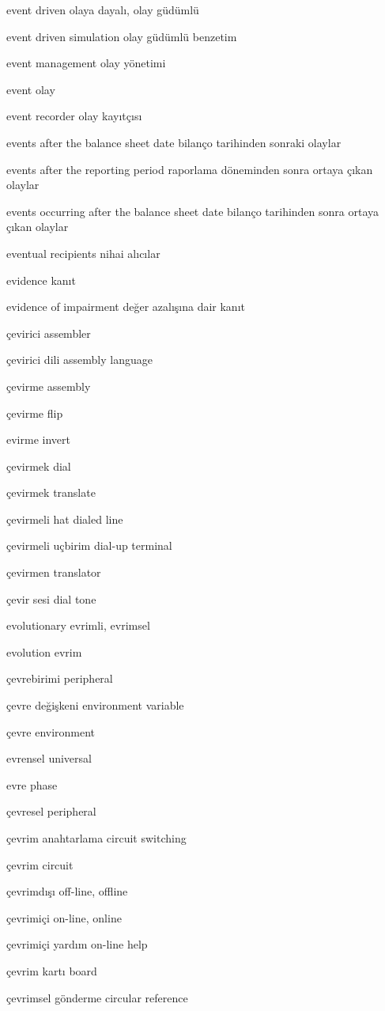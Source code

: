 \documentclass[12pt,fleqn]{article}\usepackage{../../common}
\begin{document}
event driven olaya dayalı, olay güdümlü

event driven simulation olay güdümlü benzetim

event management olay yönetimi

event olay

event recorder olay kayıtçısı

events after the balance sheet date bilanço tarihinden sonraki olaylar

events after the reporting period raporlama döneminden sonra ortaya çıkan olaylar

events occurring after the balance sheet date bilanço tarihinden sonra ortaya çıkan olaylar

eventual recipients nihai alıcılar

evidence kanıt

evidence of impairment değer azalışına dair kanıt

çevirici assembler

çevirici dili assembly language

çevirme assembly

çevirme flip

evirme invert

çevirmek dial

çevirmek translate

çevirmeli hat dialed line

çevirmeli uçbirim dial-up terminal

çevirmen translator

çevir sesi dial tone

evolutionary evrimli, evrimsel

evolution evrim

çevrebirimi peripheral

çevre değişkeni environment variable

çevre environment

evrensel universal

evre phase

çevresel peripheral

çevrim anahtarlama circuit switching

çevrim circuit

çevrimdışı off-line, offline

çevrimiçi on-line, online

çevrimiçi yardım on-line help

çevrim kartı board

çevrimsel gönderme circular reference
\end{document}
